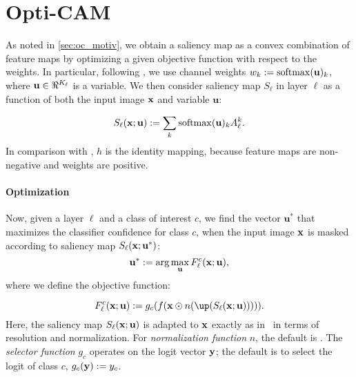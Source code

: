 \section{Opti-CAM}
\label{sec:oc_def}
As noted in \autoref{sec:oc_motiv}, we obtain a saliency map as a convex combination of feature 
maps by optimizing a given objective function with respect to the weights.
In particular, following \autocite{wang2020score}, we use channel weights $w_k \mathrel{:=} \operatorname{softmax}(
\mathbf{u})_k$, where $\mathbf{u} \in \real^{K_\ell}$ is a variable.
We then consider saliency map $S_\ell$ in layer $\ell$ as a function of both the input image $\mathbf{x}$ 
and variable $\mathbf{u}$:

\begin{equation}
    S_\ell(\mathbf{x}; \mathbf{u}) \mathrel{:=} \sum_k \operatorname{softmax}(\mathbf{u})_k A^k_\ell.
\label{eq:v-sal}
\end{equation}
In comparison with , $h$ is the identity mapping, because feature maps are non-negative and 
weights are positive.
\paragraph{Optimization}
Now, given a layer $\ell$ and a class of interest $c$, we find the vector $\mathbf{u}^*$ that 
maximizes the classifier confidence for class $c$, when the input image $\mathbf{x}$ is masked according 
to saliency map $S_\ell(\mathbf{x}; \mathbf{u}^*)$:
\begin{equation}
	\mathbf{u}^* \mathrel{:=} \arg\max_{\mathbf{u}} F^c_\ell(\mathbf{x}; \mathbf{u}),
\label{eq:opt}
\end{equation}
where we define the objective function:

\begin{equation}
	F^c_\ell(\vx; \mathbf{u}) \defn g_c(f(\vx \odot n(\up(S_\ell(\vx; \mathbf{u}))))).
\label{eq:obj}
\end{equation}
Here, the saliency map $S_\ell(\mathbf{x}; \mathbf{u})$ is adapted to $\mathbf{x}$ exactly as in~ in 
terms of resolution and normalization. For \emph{normalization function} $n$, the default is
 . 
The \emph{selector function} $g_c$ operates on the logit vector $\mathbf{y}$; the default is to select the 
logit of class $c$, \ie $g_c(\mathbf{y}) \mathrel{:=} y_c$. \\

